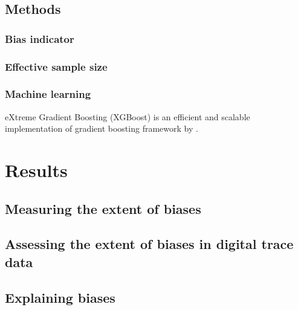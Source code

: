 \documentclass[]{rsos}%
\begin{document}
\hypertarget{methods}{%
\subsection{Methods}\label{methods}}

\hypertarget{bias-indicator}{%
\subsubsection{Bias indicator}\label{bias-indicator}}

\hypertarget{effective-sample-size}{%
\subsubsection{Effective sample size}\label{effective-sample-size}}

\hypertarget{machine-learning}{%
\subsubsection{Machine learning}\label{machine-learning}}

eXtreme Gradient Boosting (XGBoost) is an efficient and scalable implementation of gradient boosting framework by \citep{friedman2001, friedman2000}.

\hypertarget{results}{%
\section{Results}\label{results}}

\hypertarget{measuring-the-extent-of-biases}{%
\subsection{Measuring the extent of biases}\label{measuring-the-extent-of-biases}}

\hypertarget{assessing-the-extent-of-biases-in-digital-trace-data}{%
\subsection{Assessing the extent of biases in digital trace data}\label{assessing-the-extent-of-biases-in-digital-trace-data}}

\hypertarget{explaining-biases}{%
\subsection{Explaining biases}\label{explaining-biases}}
\end{document}
